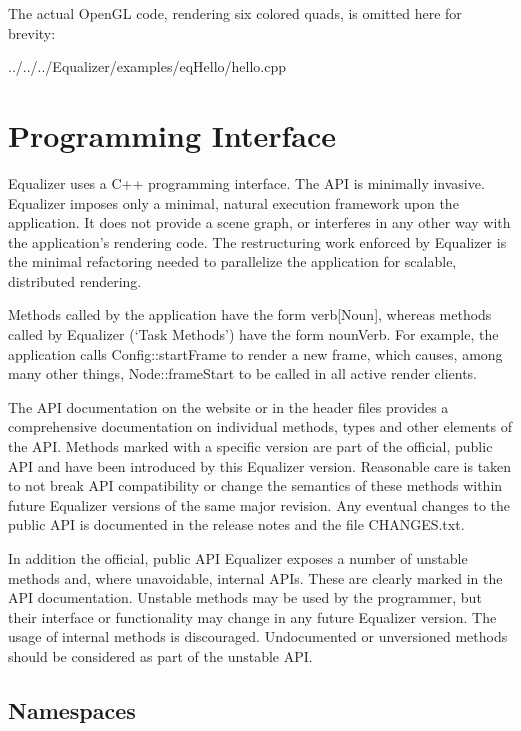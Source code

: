 \documentclass[10pt,a4]{scrartcl}
\begin{document}
The actual OpenGL code, rendering six colored quads, is omitted here for
brevity:

{\footnotesize
  {../../../Equalizer/examples/eqHello/hello.cpp}}


\section{Programming Interface}

Equalizer uses a C++ programming interface. The API is minimally
invasive. Equalizer imposes only a minimal, natural execution framework upon the
application. It does not provide a scene graph, or interferes in any other way
with the application's rendering code. The restructuring work enforced by
Equalizer is the minimal refactoring needed to parallelize the application for
scalable, distributed rendering.

Methods called by the application have the form \textsf{verb[Noun]},
whereas methods called by Equalizer (`Task Methods') have the form
\textsf{nounVerb}. For example, the application calls
\textsf{Config::startFrame} to render a new frame, which causes, among
many other things, \textsf{Node::frameStart} to be called in all active
render clients.

The API documentation on the website or in the header files provides a
comprehensive documentation on individual methods, types and other elements of
the API. Methods marked with a specific version are part of the official, public
API and have been introduced by this Equalizer version. Reasonable care is taken
to not break API compatibility or change the semantics of these methods within
future Equalizer versions of the same major revision. Any eventual changes to
the public API is documented in the release notes and the file
\textsf{CHANGES.txt}.

In addition the official, public API Equalizer exposes a number of
unstable methods and, where unavoidable, internal APIs. These are clearly marked
in the API documentation. Unstable methods may be used by the programmer, but
their interface or functionality may change in any future Equalizer version. The
usage of internal methods is discouraged. Undocumented or unversioned methods
should be considered as part of the unstable API.

\subsection{\label{sNamespaces}Namespaces}
\end{document}
